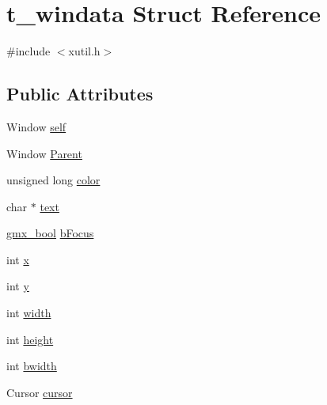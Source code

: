 \hypertarget{structt__windata}{\section{t\-\_\-windata \-Struct \-Reference}
\label{structt__windata}
}


{\ttfamily \#include $<$xutil.\-h$>$}

\subsection*{\-Public \-Attributes}
\begin{DoxyCompactItemize}
\item 
\-Window \hyperlink{structt__windata_a2f635b17bc6d3e0e352511a63ba8fff2}{self}
\item 
\-Window \hyperlink{structt__windata_a3917555272c4789c94ac78ce6e094c4b}{\-Parent}
\item 
unsigned long \hyperlink{structt__windata_a499d227d8408d2c5dbbb926f69e43b2d}{color}
\item 
char $\ast$ \hyperlink{structt__windata_a29a26a33ccfb6d366e4131174a70c282}{text}
\item 
\hyperlink{include_2types_2simple_8h_a8fddad319f226e856400d190198d5151}{gmx\-\_\-bool} \hyperlink{structt__windata_aedabb702c7a45f82083e655b5d6c4906}{b\-Focus}
\item 
int \hyperlink{structt__windata_a36dc214ec73cc4317027191f095f0352}{x}
\item 
int \hyperlink{structt__windata_a7462d9c4b9b846b703c0530681517d80}{y}
\item 
int \hyperlink{structt__windata_ad097c068786d4675810a6230b209ddb1}{width}
\item 
int \hyperlink{structt__windata_a4643232d93147981132a47af8d8b0387}{height}
\item 
int \hyperlink{structt__windata_a92f28bebdbeb62203cd3cbe67a10a4bc}{bwidth}
\item 
\-Cursor \hyperlink{structt__windata_a864597a200e5457dc5cc78455e255960}{cursor}
\end{DoxyCompactItemize}


